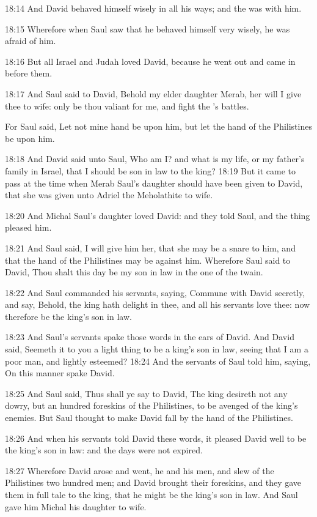 18:14 And David behaved himself wisely in all his ways; and the \LORD
was with him.

18:15 Wherefore when Saul saw that he behaved himself very wisely, he
was afraid of him.

18:16 But all Israel and Judah loved David, because he went out and
came in before them.

18:17 And Saul said to David, Behold my elder daughter Merab, her will
I give thee to wife: only be thou valiant for me, and fight the \LORD's
battles.

For Saul said, Let not mine hand be upon him, but let the hand of the
Philistines be upon him.

18:18 And David said unto Saul, Who am I? and what is my life, or my
father's family in Israel, that I should be son in law to the king?
18:19 But it came to pass at the time when Merab Saul's daughter
should have been given to David, that she was given unto Adriel the
Meholathite to wife.

18:20 And Michal Saul's daughter loved David: and they told Saul, and
the thing pleased him.

18:21 And Saul said, I will give him her, that she may be a snare to
him, and that the hand of the Philistines may be against him.
Wherefore Saul said to David, Thou shalt this day be my son in law in
the one of the twain.

18:22 And Saul commanded his servants, saying, Commune with David
secretly, and say, Behold, the king hath delight in thee, and all his
servants love thee: now therefore be the king's son in law.

18:23 And Saul's servants spake those words in the ears of David. And
David said, Seemeth it to you a light thing to be a king's son in law,
seeing that I am a poor man, and lightly esteemed?  18:24 And the
servants of Saul told him, saying, On this manner spake David.

18:25 And Saul said, Thus shall ye say to David, The king desireth not
any dowry, but an hundred foreskins of the Philistines, to be avenged
of the king's enemies. But Saul thought to make David fall by the hand
of the Philistines.

18:26 And when his servants told David these words, it pleased David
well to be the king's son in law: and the days were not expired.

18:27 Wherefore David arose and went, he and his men, and slew of the
Philistines two hundred men; and David brought their foreskins, and
they gave them in full tale to the king, that he might be the king's
son in law. And Saul gave him Michal his daughter to wife.

